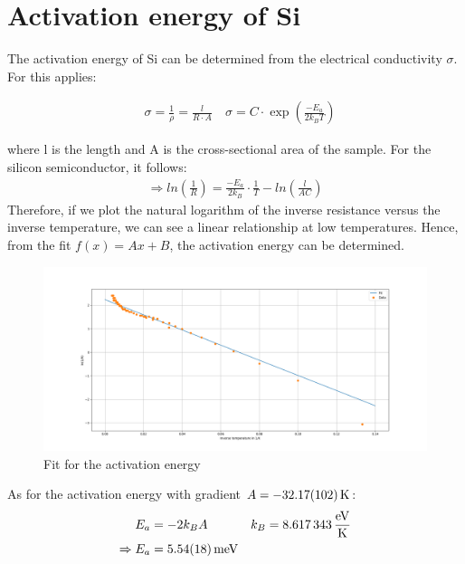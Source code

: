 
\section{Activation energy of Si}
The activation energy of Si can be determined from the electrical conductivity $\sigma$. For this applies:

\begin{align}
    &\sigma = \frac{1}{\rho} = \frac{l}{R\cdot A} \
    &\sigma = C\cdot \exp \left (\frac{-E_a}{2k_BT} \right ) 
\end{align}

where l is the length and A is the cross-sectional area of the sample. For the silicon semiconductor, it follows:
\begin{align}
    \Rightarrow ln\left( \frac{1}{R}\right ) = \frac{-E_a}{2k_B} \cdot \frac{1}{T} -ln \left ( \frac{l}{AC} \right )
\end{align}
Therefore, if we plot the natural logarithm of the inverse resistance versus the inverse temperature, we can see a linear relationship at low temperatures. Hence, from the fit $f(x) = Ax+B $, the activation energy can be determined. 
\begin{figure}
    \centering
    \includegraphics[width=1.0\textwidth]{./fig/ex4.1.png}
    \caption{Fit for the activation energy}
    \label{fig:E_activation}
\end{figure}
As for the activation energy with gradient $A = \SI{-32,17\pm1,02}{K}$:
\begin{align}
    E_a &= -2k_BA &k_B = \SI{8,617343}{\frac{eV}{K}} \\
    \Rightarrow E_a &= \SI{5,54\pm 0,18}{meV}
\end{align}